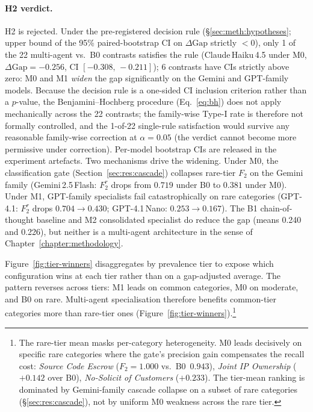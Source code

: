 \paragraph{H2 verdict.}
H2 is rejected. Under the pre-registered decision rule (\S\ref{sec:meth:hypotheses};
upper bound of the 95\% paired-bootstrap CI on $\Delta\mathrm{Gap}$ strictly
$<0$), only 1 of the 22 multi-agent vs.\ B0 contrasts satisfies the rule
(Claude\,Haiku\,4.5 under M0, $\Delta\mathrm{Gap}{=}-0.256$, CI $[-0.308,\,-0.211]$);
6 contrasts have CIs strictly above zero: M0 and M1 \emph{widen} the gap
significantly on the Gemini and GPT-family models. Because the decision
rule is a one-sided CI inclusion criterion rather than a $p$-value, the
Benjamini--Hochberg procedure (Eq.~\ref{eq:bh}) does not apply mechanically
across the 22 contrasts; the family-wise Type-I rate is therefore not formally
controlled, and the 1-of-22 single-rule satisfaction would survive any
reasonable family-wise correction at $\alpha{=}0.05$ (the verdict cannot
become more permissive under correction). Per-model bootstrap CIs
are released in the experiment artefacts. Two mechanisms drive the
widening. Under M0, the classification gate (Section~\ref{sec:res:cascade})
collapses rare-tier $F_2$ on the Gemini family (Gemini\,2.5\,Flash: $F_2^r$
drops from $0.719$ under B0 to $0.381$ under M0). Under M1, GPT-family
specialists fail catastrophically on rare categories (GPT-4.1: $F_2^r$ drops
$0.704 \to 0.430$; GPT-4.1\,Nano: $0.253 \to 0.167$). The B1 chain-of-thought
baseline and M2 consolidated specialist do reduce the gap (means 0.240 and
0.226), but neither is a multi-agent architecture in the sense of
Chapter~\ref{chapter:methodology}.

Figure~\ref{fig:tier-winners} disaggregates by prevalence tier to expose which
configuration wins at each tier rather than on a gap-adjusted average. The
pattern reverses across tiers: M1 leads on common categories, M0 on moderate,
and B0 on rare. Multi-agent specialisation therefore benefits common-tier categories
more than rare-tier ones (Figure~\ref{fig:tier-winners}).\footnote{The
rare-tier mean masks per-category heterogeneity. M0 leads decisively on
specific rare categories where the gate's precision gain compensates the
recall cost: \textit{Source Code Escrow} ($F_2{=}1.000$ vs.\ B0~$0.943$),
\textit{Joint IP Ownership} ($+0.142$ over B0), \textit{No-Solicit of
Customers} ($+0.233$). The tier-mean ranking is dominated by Gemini-family
cascade collapse on a subset of rare categories
(\S\ref{sec:res:cascade}), not by uniform M0 weakness across the rare tier.}

